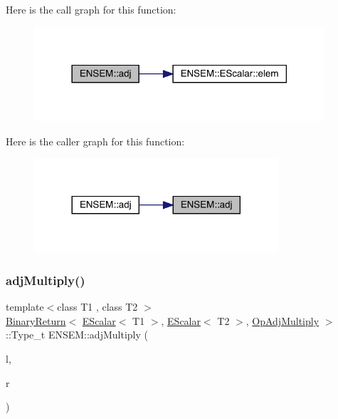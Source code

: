 Here is the call graph for this function\+:\nopagebreak
\begin{figure}[H]
\begin{center}
\leavevmode
\includegraphics[width=306pt]{d4/dca/group__escalar_ga51071562edd203962f48e4b44f0c0a0c_cgraph}
\end{center}
\end{figure}
Here is the caller graph for this function\+:\nopagebreak
\begin{figure}[H]
\begin{center}
\leavevmode
\includegraphics[width=257pt]{d4/dca/group__escalar_ga51071562edd203962f48e4b44f0c0a0c_icgraph}
\end{center}
\end{figure}
\mbox{\label{group__escalar_ga8cef36c4e2779c7d7dbf64b9500b053c}} 
\subsubsection{\texorpdfstring{adjMultiply()}{adjMultiply()}}
{\footnotesize\ttfamily template$<$class T1 , class T2 $>$ \\
\mbox{\hyperlink{structENSEM_1_1BinaryReturn}{Binary\+Return}}$<$ \mbox{\hyperlink{classENSEM_1_1EScalar}{E\+Scalar}}$<$ T1 $>$, \mbox{\hyperlink{classENSEM_1_1EScalar}{E\+Scalar}}$<$ T2 $>$, \mbox{\hyperlink{structENSEM_1_1OpAdjMultiply}{Op\+Adj\+Multiply}} $>$\+::Type\+\_\+t E\+N\+S\+E\+M\+::adj\+Multiply (\begin{DoxyParamCaption}\item[{const \mbox{\hyperlink{classENSEM_1_1EScalar}{E\+Scalar}}$<$ T1 $>$ \&}]{l,  }\item[{const \mbox{\hyperlink{classENSEM_1_1EScalar}{E\+Scalar}}$<$ T2 $>$ \&}]{r }\end{DoxyParamCaption})\hspace{0.3cm}{\ttfamily [inline]}}

